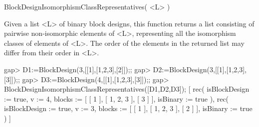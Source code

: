 \>BlockDesignIsomorphismClassRepresentatives( <L> )

Given a list <L> of binary block designs, this function returns a list
consisting of pairwise non-isomorphic elements of <L>, representing all
the isomorphism classes of elements of <L>. The order of the elements
in the returned list may differ from their order in <L>.

\beginexample 
gap> D1:=BlockDesign(3,[[1],[1,2,3],[2]]);;
gap> D2:=BlockDesign(3,[[1],[1,2,3],[3]]);;
gap> D3:=BlockDesign(4,[[1],[1,2,3],[3]]);; 
gap> BlockDesignIsomorphismClassRepresentatives([D1,D2,D3]);
[ rec( isBlockDesign := true, v := 4, blocks := [ [ 1 ], [ 1, 2, 3 ], [ 3 ] ],
      isBinary := true ), 
  rec( isBlockDesign := true, v := 3, blocks := [ [ 1 ], [ 1, 2, 3 ], [ 2 ] ],
      isBinary := true ) ]
\endexample
